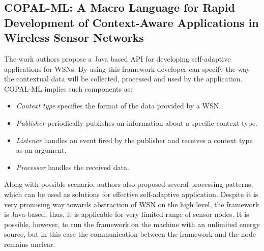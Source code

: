 \subsection{COPAL-ML: A Macro Language for Rapid Development of Context-Aware
Applications in Wireless Sensor Networks}

The work authors propose a Java based API for developing self-adaptive
applications for WSNs. By using this framework developer can specify the way the
contextual data will be collected, processed and used by the application.
COPAL-ML implies such components as:
\begin{itemize}
\item \emph{Context type} specifies the format of the data provided by a WSN.
\item \emph{Publisher} periodically publishes an information about a specific
context type.
\item \emph{Listener} handles an event fired by the publisher and receives a
context type as an argument.
\item \emph{Processor} handles the received data.
\end{itemize}

Along with possible scenario, authors also proposed several processing patterns,
which can be used as solutions for effective self-adaptive application. Despite it
is very promising way towards abstraction of WSN on the high level, the
framework is Java-based, thus, it is applicable for very limited range of sensor
nodes. It is possible, however, to run the framework on the machine with an
unlimited energy source, but in this case the communication between the
framework and the node remains unclear.